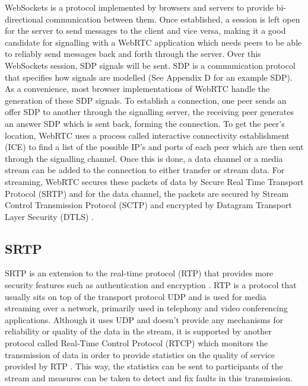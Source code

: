 \documentclass[]{report}
\begin{document}
	WebSockets is a protocol implemented by browsers and servers to provide bi-directional communication between them\cite{WebSockets}. Once established, a session is left open for the server to send messages to the client and vice versa, making it a good candidate for signalling with a WebRTC application which needs peers to be able to reliably send messages back and forth through the server. Over this WebSockets session, SDP signals will be sent. SDP is a communication protocol that specifies how signals are modelled \cite{SDP Over WebSockets} (See Appendix D for an example SDP). As a convenience, most browser implementations of WebRTC handle the generation of these SDP signals. To establish a connection, one peer sends an offer SDP to another through the signalling server, the receiving peer generates an answer SDP which is sent back, forming the connection. To get the peer's location, WebRTC uses a process called interactive connectivity establishment (ICE) to find a list of the possible IP's and ports of each peer which are then sent through the signalling channel. Once this is done, a data channel or a media stream can be added to the connection to either transfer or stream data. For streaming, WebRTC secures these packets of data by Secure Real Time Transport Protocol (SRTP) and for the data channel, the packets are secured by Stream Control Transmission Protocol (SCTP) and encrypted by Datagram Transport Layer Security (DTLS) \cite{WebRTC Data Channel Establishment Protocol}. 
	
	  \subsection{SRTP}
	  SRTP is an extension to the real-time protocol (RTP) that provides more security features such as authentication and encryption \cite{SRTP}. RTP is a protocol that usually sits on top of the transport protocol UDP and is used for media streaming over a network, primarily used in telephony and video conferencing applications. Although it uses UDP and doesn't provide any mechanisms for reliability or quality of the data in the stream, it is supported by another protocol called Real-Time Control Protocol (RTCP) which monitors the transmission of data in order to provide statistics on the quality of service provided by RTP \cite{RTP}. This way, the statistics can be sent to participants of the stream and measures can be taken to detect and fix faults in this transmission.
	  
\end{document}

